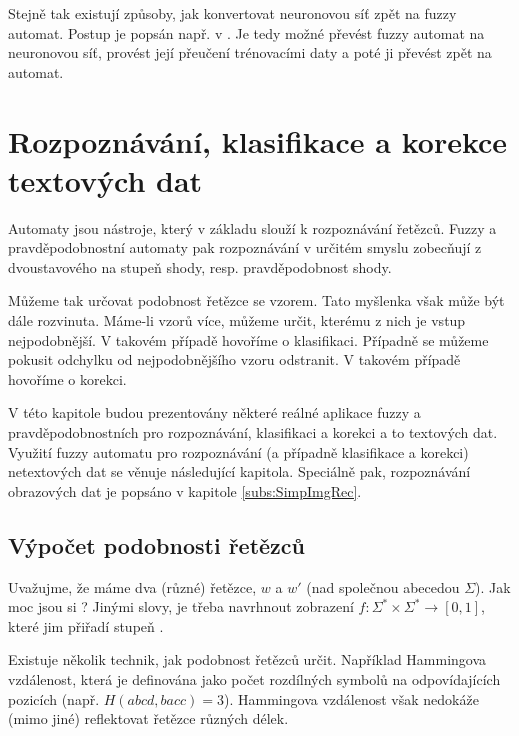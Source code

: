 Stejně tak existují způsoby, jak konvertovat neuronovou síť zpět na fuzzy automat. Postup je popsán např. v \cite{BlaDelFlo-MethIndFuzzAutUsNeuNet, BlaDelPeg-FuzzGraIntUsiNeuNet}. Je tedy možné převést fuzzy automat na neuronovou síť, provést její přeučení trénovacími daty a poté ji převést zpět na automat.


\section{Rozpoznávání, klasifikace a korekce textových dat} \label{sec:Rec}
Automaty jsou nástroje, který v základu slouží k rozpoznávání řetězců. Fuzzy a pravděpodobnostní automaty pak rozpoznávání v určitém smyslu zobecňují z dvoustavového  na stupeň shody, resp. pravděpodobnost shody. 

Můžeme tak určovat podobnost řetězce se vzorem. Tato myšlenka však může být dále rozvinuta. Máme-li vzorů více, můžeme určit, kterému z nich je vstup nejpodobnější. V takovém případě hovoříme o klasifikaci. Případně se můžeme pokusit odchylku od nejpodobnějšího vzoru odstranit. V takovém případě hovoříme o korekci.

V této kapitole budou prezentovány některé reálné aplikace fuzzy a pravděpodobnostních pro rozpoznávání, klasifikaci a korekci a to textových dat. Využití fuzzy automatu pro rozpoznávání (a případně klasifikace a korekci) netextových dat se věnuje následující kapitola. Speciálně pak, rozpoznávání obrazových dat je popsáno v kapitole \ref{subs:SimpImgRec}.

\subsection{Výpočet podobnosti řetězců}
Uvažujme, že máme dva (různé) řetězce, $w$ a $w'$ (nad společnou abecedou $\Sigma$). Jak moc jsou si ? Jinými slovy, je třeba navrhnout zobrazení $f: \Sigma^* \times \Sigma^* \rightarrow [0,1]$, které jim přiřadí stupeň .

Existuje několik technik, jak podobnost řetězců určit. Například Hammingova vzdálenost, která je definována jako počet rozdílných symbolů na odpovídajících pozicích (např. $H(abcd, bacc) = 3$). Hammingova vzdálenost však nedokáže (mimo jiné) reflektovat řetězce různých délek.


